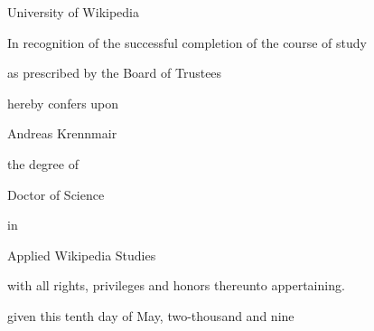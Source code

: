 \documentclass[a4paper,12pt,landscape]{article}
\newcommand{\HEADER}{\fontsize{80}{80}}
\newcommand{\HUGE}{\fontsize{50}{80}}
\begin{document}
\begin{center}
{\HEADER \pgothfamily University of Wikipedia}

{\Huge \pgothfamily In recognition of the successful completion of the course of study}

{\Huge \pgothfamily as prescribed by the Board of Trustees}

{\Huge \pgothfamily hereby confers upon}

{\HUGE \pgothfamily Andreas Krennmair}

{\Huge \pgothfamily the degree of}

{\HUGE \pgothfamily Doctor of Science}

{\Huge \pgothfamily in}

{\HUGE \pgothfamily Applied Wikipedia Studies}

{\Huge \pgothfamily with all rights, privileges and honors thereunto appertaining.}

{\Huge \pgothfamily given this tenth day of May, two-thousand and nine}
\end{center}
\end{document}
